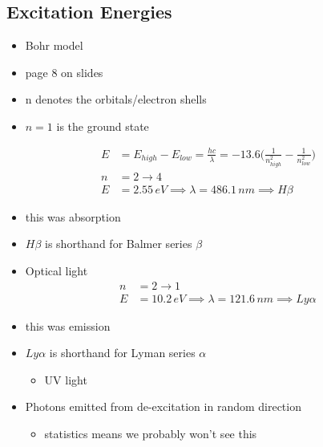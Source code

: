 \documentclass[a4paper,11pt,normalem]{article}
\begin{document}
\section{}

\subsection{Excitation Energies}
\begin{itemize}
    \item Bohr model
    \item page 8 on slides
    \item n denotes the orbitals/electron shells
    \item $n = 1$ is the ground state
\end{itemize}

\begin{align}
    E &= E_{high} - E_{low} = \frac{hc}{\lambda} = -13.6\Big(\frac{1}{n_{high}^2} - \frac{1}{n_{low}^2} \Big) \\
    n &= 2 \to 4 \\
    E &= 2.55\,eV \implies \lambda = 486.1\,nm \implies H\beta
\end{align}

\begin{itemize}
    \item this was absorption
    \item \(H\beta\) is shorthand for Balmer series \(\beta\)
    \item Optical light
        \begin{align}
            n &= 2 \to 1 \\
            E &= 10.2\,eV \implies \lambda = 121.6\,nm \implies Ly\alpha
        \end{align}
    \item this was emission
    \item\(Ly\alpha\) is shorthand for Lyman series \(\alpha\)
          \begin{itemize}
            \item UV light
          \end{itemize}
    \item Photons emitted from de-excitation in random direction
        \begin{itemize}
            \item statistics means we probably won't see this
        \end{itemize}
\end{itemize}
\end{document}
